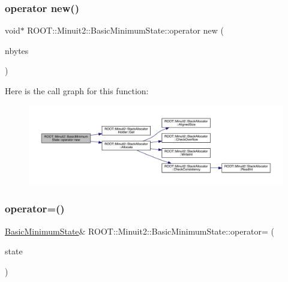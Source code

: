 \subsubsection{\texorpdfstring{operator new()}{operator new()}\hspace{0.1cm}{\footnotesize\ttfamily [2/2]}}
{\footnotesize\ttfamily void$\ast$ R\+O\+O\+T\+::\+Minuit2\+::\+Basic\+Minimum\+State\+::operator new (\begin{DoxyParamCaption}\item[{size\+\_\+t}]{nbytes }\end{DoxyParamCaption})\hspace{0.3cm}{\ttfamily [inline]}}

Here is the call graph for this function\+:
\nopagebreak
\begin{figure}[H]
\begin{center}
\leavevmode
\includegraphics[width=350pt]{d0/db1/classROOT_1_1Minuit2_1_1BasicMinimumState_ad0e5ab496757c5bee3544485a49fe7aa_cgraph}
\end{center}
\end{figure}
\mbox{\label{classROOT_1_1Minuit2_1_1BasicMinimumState_a68cf1c28f5f728fa62a0c39ff943a2bf}} 
\subsubsection{\texorpdfstring{operator=()}{operator=()}\hspace{0.1cm}{\footnotesize\ttfamily [1/2]}}
{\footnotesize\ttfamily \mbox{\hyperlink{classROOT_1_1Minuit2_1_1BasicMinimumState}{Basic\+Minimum\+State}}\& R\+O\+O\+T\+::\+Minuit2\+::\+Basic\+Minimum\+State\+::operator= (\begin{DoxyParamCaption}\item[{const \mbox{\hyperlink{classROOT_1_1Minuit2_1_1BasicMinimumState}{Basic\+Minimum\+State}} \&}]{state }\end{DoxyParamCaption})\hspace{0.3cm}{\ttfamily [inline]}}

